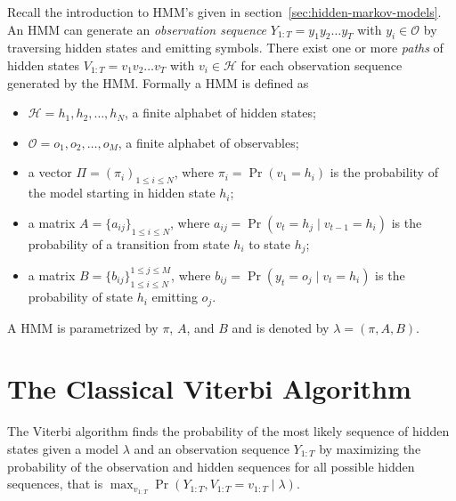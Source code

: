 Recall the introduction to HMM's given in
section~\ref{sec:hidden-markov-models}. An HMM can generate an \emph{observation
 sequence} $Y_{1:T} = y_1y_2\dots{}y_T$ with $y_i \in \mathcal{O}$ by
traversing hidden states and emitting symbols. There exist one or more
\emph{paths} of hidden states $V_{1:T} = v_1v_2\dots{}v_T$ with
$v_i \in \mathcal{H}$ for each observation sequence generated by the HMM. Formally
a HMM is defined as
\begin{itemize}
\item $\mathcal{H} = {h_1, h_2, \dots, h_N}$, a finite alphabet of hidden
  states;
\item $\mathcal{O} = {o_1, o_2, \dots, o_M}$, a finite alphabet of observables;
\item a vector $\Pi = {(\pi_i)}_{1 \le i \le N}$, where $\pi_i = \Pr(v_1 =
  h_i)$ is the probability of the model starting in hidden state $h_i$;
\item a matrix $A = {\{a_{ij}\}}_{1 \le i \le N}$, where $a_{ij} = \Pr(v_t
  = h_j \mid v_{t - 1} = h_i)$ is the probability of a transition from state
  $h_i$ to state $h_j$;
\item a matrix $B = {\{b_{ij}\}}_{1 \le i \le N}^{1 \le j \le M}$, where
  $b_{ij} = \Pr(y_t = o_j \mid v_t = h_i)$ is the probability of state
  $h_i$ emitting $o_j$.
\end{itemize}
A HMM is parametrized by $\pi$, $A$, and $B$ and is denoted by $\lambda =
(\pi, A, B)$.

\section{The Classical Viterbi Algorithm}
\label{sec:class-viterbi-algor}

The Viterbi algorithm finds the probability of the most likely sequence of
hidden states given a model $\lambda$ and an observation sequence $Y_{1:T}$ by
maximizing the probability of the observation and hidden sequences for all
possible hidden sequences, that is
$\max_{v_{1:T}} \Pr(Y_{1:T}, V_{1:T} = v_{1:T} \mid \lambda)$.


